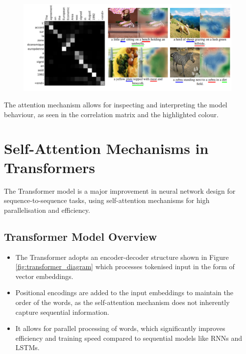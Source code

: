 \begin{figure}[H]
    \centering
    \includegraphics[width=0.75\linewidth]{img/attention_mechanism_example.png}
\end{figure}

The attention mechanism allows for inspecting and interpreting the model behaviour, as seen in the correlation matrix and the highlighted colour.

\section{Self-Attention Mechanisms in Transformers}
The Transformer model is a major improvement in neural network design for sequence-to-sequence tasks, using self-attention mechanisms for high parallelisation and efficiency.

\subsection{Transformer Model Overview}
\begin{itemize}
    \item The Transformer adopts an encoder-decoder structure shown in Figure \ref{fig:transformer_diagram} which processes tokenised input in the form of vector embeddings. 
    \item Positional encodings are added to the input embeddings to maintain the order of the words, as the self-attention mechanism does not inherently capture sequential information.
    \item It allows for parallel processing of words, which significantly improves efficiency and training speed compared to sequential models like RNNs and LSTMs.
\end{itemize}



